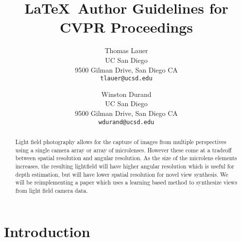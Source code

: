 \documentclass[10pt,twocolumn,letterpaper]{article}
\begin{document}
\title{\LaTeX\ Author Guidelines for CVPR Proceedings}

\author{Thomas Lauer\\
UC San Diego\\
9500 Gilman Drive, San Diego CA\\
{\tt\small tlauer@ucsd.edu}
\and
Winston Durand\\
UC San Diego\\
9500 Gilman Drive, San Diego CA\\
{\tt\small wdurand@ucsd.edu}
}

\maketitle

\begin{abstract}
Light field photography allows for the capture of images from multiple
perspectives using a single camera array or array of microlenses. However
these come at a tradeoff between spatial resolution and angular resolution.
As the size of the microlens elements increases, the resulting lightfield
will have higher angular resolution which is useful for depth estimation,
but will have lower spatial resolution for novel view synthesis.
We will be reimplementing a paper \cite{LearningViewSynthesis} which uses a
learning based method to synthesize views from light field camera data.
\end{abstract}


\section{Introduction}
\end{document}
